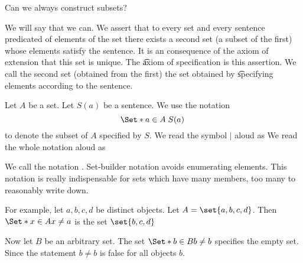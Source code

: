 
\sbasic







\sstart
{}


Can we always construct
subsets?


We will say that we can.
We assert that to every set and every sentence predicated of elements of the set there exists a second set (a subset of the first) whose elements satisfy the sentence.
It is an consequence of the axiom of extension that this set is unique.
The \t{axiom of specification} is this assertion.
We call the second set (obtained from the first) the set obtained by \t{specifying} elements according to the sentence.


Let $A$ be a set.
Let $S(a)$ be a sentence.
We use the notation
\[
  \Set*{a \in A}{\;S(a)\;}
\]
to denote the subset of $A$
specified by $S$.
We read the symbol $\mid$ aloud as
We read the whole notation aloud as

We call the notation
.
Set-builder notation avoids enumerating
elements.
This notation is really indispensable for
sets which have many members, too many
to reasonably write down.


For example, let $a, b, c, d$
be distinct objects.
Let $A = \set{a, b, c, d}$.
Then
$\Set*{x \in A}{x \neq a}$
is the set $\set{b, c, d}$

Now let $B$ be an arbitrary
set.
The set $\Set*{b \in B}{b \neq b}$
specifies the empty set.
Since the statement $b \neq b$ is
false for all objects $b$.

\strats
